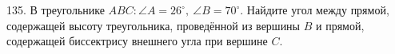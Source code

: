 135. В треугольнике $ABC: \angle A=26^\circ,\ \angle B=70^\circ.$ Найдите угол между прямой, содержащей высоту треугольника, проведённой из вершины $B$ и прямой, содержащей биссектрису внешнего угла при вершине $C.$\\
